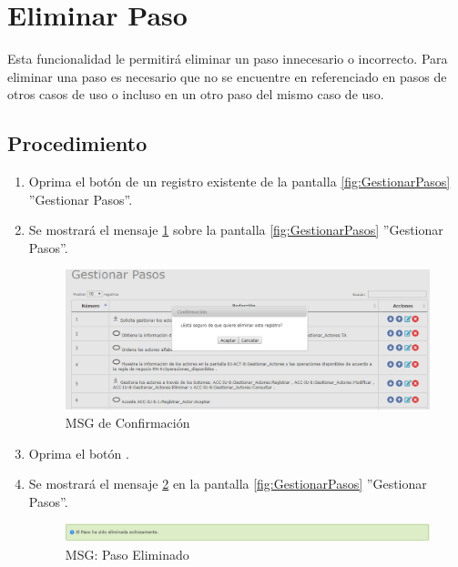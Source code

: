 \hypertarget{cv:eliminarPaso}{\section{Eliminar Paso}} \label{sec:eliminarPaso}

	Esta funcionalidad le permitirá eliminar un paso innecesario o incorrecto. Para eliminar una paso es necesario que no se encuentre en referenciado en pasos de otros casos de uso o incluso en un otro paso del mismo caso de uso.

		\subsection{Procedimiento}

			\begin{enumerate}
	
			\item Oprima el botón \IUBotonEliminar{} de un registro existente de la pantalla \ref{fig:GestionarPasos} ''Gestionar Pasos''.
	
			\item Se mostrará el mensaje \ref{fig:confirmaEliminaPaso} sobre la pantalla \ref{fig:GestionarPasos} ''Gestionar Pasos''.
			
			\begin{figure}[htbp!]
				\begin{center}
					\includegraphics[scale=0.6]{roles/lider/casosUso/trayectorias/pasos/pantallas/IU6-1-1-1-3MSG10}
					\caption{MSG de Confirmación}
					\label{fig:confirmaEliminaPaso}
				\end{center}
			\end{figure}
						
			\item Oprima el botón \IUAceptar.
			
			\item Se mostrará el mensaje \ref{fig:pasoEliminado} en la pantalla \ref{fig:GestionarPasos} ''Gestionar Pasos''.
			
			\begin{figure}[htbp!]
				\begin{center}
					\includegraphics[scale=0.6]{roles/lider/casosUso/trayectorias/pasos/pantallas/IU6-1-1-1-3MSG1}
					\caption{MSG: Paso Eliminado}
					\label{fig:pasoEliminado}
				\end{center}
			\end{figure}
			\end{enumerate}